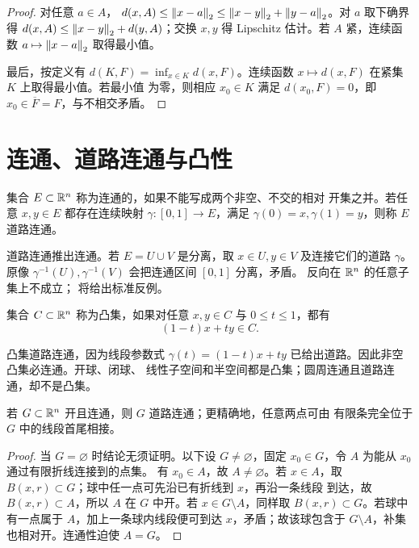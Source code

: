 \begin{proof}
对任意 \(a\in A\)，
\(d(x,A)\le\left\lVert x-a\right\rVert_2\le\left\lVert x-y\right\rVert_2+\left\lVert y-a\right\rVert_2\)。对 \(a\)
取下确界得 \(d(x,A)\le\left\lVert x-y\right\rVert_2+d(y,A)\)；交换 \(x,y\) 得
Lipschitz 估计。若 \(A\) 紧，连续函数
\(a\mapsto\left\lVert x-a\right\rVert_2\) 取得最小值。

最后，按定义有 \(d(K,F)=\inf_{x\in K}d(x,F)\)。连续函数
\(x\mapsto d(x,F)\) 在紧集 \(K\) 上取得最小值。若最小值
为零，则相应 \(x_0\in K\) 满足 \(d(x_0,F)=0\)，即
\(x_0\in\overline F=F\)，与不相交矛盾。
\end{proof}

\section{连通、道路连通与凸性}

\begin{definition}[连通与道路连通]
集合 \(E\subset\mathbb{R}^n\) 称为连通的，如果不能写成两个非空、不交的相对
开集之并。若任意 \(x,y\in E\) 都存在连续映射
\(\gamma:[0,1]\to E\)，满足 \(\gamma(0)=x,\gamma(1)=y\)，则称
\(E\) 道路连通。
\end{definition}

道路连通推出连通。若 \(E=U\cup V\) 是分离，取 \(x\in U,y\in V\)
及连接它们的道路 \(\gamma\)。原像
\(\gamma^{-1}(U),\gamma^{-1}(V)\) 会把连通区间 \([0,1]\) 分离，矛盾。
反向在 \(\mathbb{R}^n\) 的任意子集上不成立；
将给出标准反例。

\begin{definition}[凸集]
集合 \(C\subset\mathbb{R}^n\) 称为凸集，如果对任意 \(x,y\in C\) 与
\(0\le t\le1\)，都有
\[
 (1-t)x+ty\in C.
\]
\end{definition}

凸集道路连通，因为线段参数式
\(\gamma(t)=(1-t)x+ty\) 已给出道路。因此非空凸集必连通。开球、闭球、
线性子空间和半空间都是凸集；圆周连通且道路连通，却不是凸集。

\begin{theorem}[欧氏开集的连通性]
\label{thm:open-connected-path-connected-euclidean}
若 \(G\subset\mathbb{R}^n\) 开且连通，则 \(G\) 道路连通；更精确地，任意两点可由
有限条完全位于 \(G\) 中的线段首尾相接。
\end{theorem}

\begin{proof}
当 \(G=\varnothing\) 时结论无须证明。以下设 \(G\ne\varnothing\)，固定
\(x_0\in G\)，令 \(A\) 为能从 \(x_0\) 通过有限折线连接到的点集。
有 \(x_0\in A\)，故 \(A\ne\varnothing\)。若 \(x\in A\)，取
\(B(x,r)\subset G\)；球中任一点可先沿已有折线到 \(x\)，再沿一条线段
到达，故 \(B(x,r)\subset A\)，所以 \(A\) 在 \(G\) 中开。若
\(x\in G\setminus A\)，同样取 \(B(x,r)\subset G\)。若球中有一点属于
\(A\)，加上一条球内线段便可到达 \(x\)，矛盾；故该球包含于
\(G\setminus A\)，补集也相对开。连通性迫使 \(A=G\)。
\end{proof}

